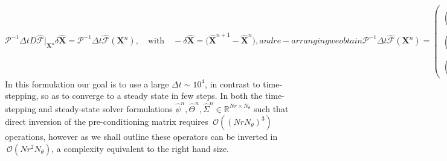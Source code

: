 \documentclass[a4paper]{article}
\newcommand{\Pran}{Pr}
\begin{document}
\begin{subequations}
\begin{equation}
\mathcal{P}^{-1} \Delta t D \hat{\mathcal{F}}|_{\boldsymbol{X}^n} \delta \hat{\boldsymbol{X}} = \mathcal{P}^{-1} \Delta t \hat{\mathcal{F}}(\boldsymbol{X}^n), \quad \text{with} \quad -\delta \hat{\boldsymbol{X}}  = \big( \hat{\boldsymbol{X}}^{n+1} - \hat{\boldsymbol{X}}^n \big),
\label{eq:Newton_Iteration_Pre}
\end{equation}
and re-arranging we obtain
\begin{equation}
\mathcal{P}^{-1} \Delta t \hat{\mathcal{F}}(\boldsymbol{X}^n) = 
\begin{pmatrix}
(\hat{A}^2 - \Delta t \Pran \hat{A}^4)^{-1} \big[ \hat{A}^2 \hat{\psi}^n + \Delta t N_{\psi} \big] - \hat{\psi}^n \\
(r^2 - r^2 \Delta t \; \; \hat{\nabla}^2)^{-1} \big[ r^2 \hat{\Theta}^n + \Delta t N_{\Theta} \big] - \hat{\Theta}^n \\
(r^2 - r^2 \Delta t \tau \hat{\nabla}^2)^{-1} \big[ r^2 \hat{\Sigma}^n + \Delta t N_{\Sigma} \big] - \hat{\Sigma}^n
\end{pmatrix},
\end{equation}
\begin{equation}
\mathcal{P}^{-1} \Delta t D \hat{\mathcal{F}}|_{\boldsymbol{X}^n} \delta \hat{\boldsymbol{X}} = 
\begin{pmatrix}
(\hat{A}^2 - \Delta t \Pran \hat{A}^4)^{-1} \big[ \hat{A}^2 \delta \hat{\psi} + \Delta t \tilde{N}_{\psi}(\delta \hat{\psi}) \big] - \delta \hat{\psi} \\
(r^2 - r^2 \Delta t \; \; \hat{\nabla}^2)^{-1} \big[ r^2 \delta \hat{\Theta} + \Delta t \tilde{N}_{\Theta} ( \delta \hat{\Theta} ) \big] - \delta \hat{\Theta} \\
(r^2 - r^2 \Delta t \tau \hat{\nabla}^2)^{-1} \big[ r^2 \delta \hat{\Sigma} + \Delta t \tilde{N}_{\Sigma}(\delta \hat{\Sigma}) \big] - \delta \hat{\Sigma}
\end{pmatrix}.
\end{equation}
\label{eq:Preconditioned_Steady_State}
\end{subequations}
In this formulation our goal is to use a large $\Delta t \sim 10^4$, in contrast to time-stepping, so as to converge to a steady state in few steps. In both the time-stepping and steady-state solver formulations $\hat{\psi}^n, \hat{\Theta}^n, \hat{\Sigma}^n \in \mathbb{R}^{Nr \times N_{\theta}}$ such that direct inversion of the pre-conditioning matrix requires $~\mathcal{O}( (NrN_{\theta})^3 )$ operations, however as we shall outline these operators can be inverted in $~\mathcal{O}( Nr^2 N_{\theta} )$, a complexity equivalent to the right hand size.
\end{document}
